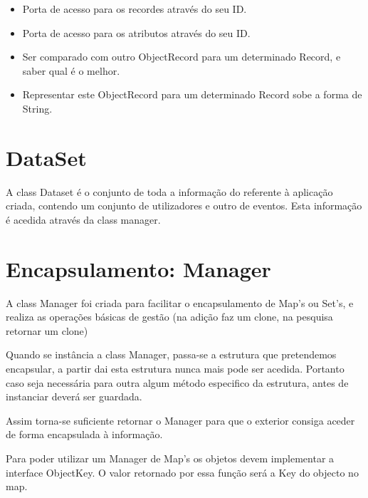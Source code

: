 \begin{itemize}
 \item Porta de acesso para os recordes através do seu ID.
 \item Porta de acesso para os atributos através do seu ID.
 \item Ser comparado com outro ObjectRecord para um determinado Record, e saber qual é o melhor.
 \item Representar este ObjectRecord para um determinado Record sobe a forma de String.
\end{itemize}








\section{DataSet}
\label{sec:manager}
A class Dataset é o conjunto de toda a informação do referente à aplicação criada, contendo um conjunto de utilizadores e outro de eventos. Esta informação é acedida através da class manager.



\section{Encapsulamento: Manager}
\label{sec:manager}
A class Manager foi criada para facilitar o encapsulamento de Map's ou Set's, e realiza as operações básicas de gestão (na adição faz um clone, na pesquisa retornar um clone)

Quando se instância a class Manager, passa-se a estrutura que pretendemos encapsular, a partir dai esta estrutura nunca mais pode ser acedida. Portanto caso seja necessária para outra algum método especifico da estrutura, antes de instanciar deverá ser guardada.

Assim torna-se suficiente retornar o Manager para que o exterior consiga aceder de forma encapsulada à informação.

Para poder utilizar um Manager de Map's os objetos devem implementar a interface ObjectKey. O valor retornado por essa função será a Key do objecto no map.

